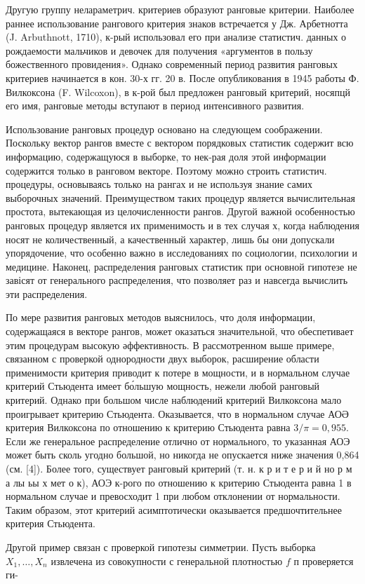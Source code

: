 \documentclass[10pt]{article}
\begin{document}
Другую группу нелараметрич. критериев образуют ранговые критерии. Наиболее раннее использование рангового критерия знаков встречается у Дж. Арбетнотта (J. Arbuthnott, 1710), к-рый использовал его при анализе статистич. данных о рождаемости мальчиков и девочек для получения «аргументов в пользу божественного провидения». Однако современный период развития ранговых критериев начинается в кон. 30-х гг. 20 в. После опубликования в 1945 работы Ф. Вилкоксона (F. Wilcoxon), в к-рой был предложен ранговый критерий, носяпцй его имя, ранговые методы вступают в период интенсивного развития.



Использование ранговых процедур основано на следующем соображении. Поскольку вектор рангов вместе с вектором порядковых статистик содержит всю информацию, содержащуюся в выборке, то нек-рая доля этой информации содержится только в ранговом векторе. Поэтому можно строить статистич. процедуры, основываясь только на рангах и не используя знание самих выборочных значений. Преимуществом таких процедур является вычислительная простота, вытекающая из целочисленности рангов. Другой важной особенностью ранговых процедур является их применимость и в тех случая х, когда наблюдения носят не количественный, а качественный характер, лишь бы они допускали упорядочение, что особенно важно в исследованиях по социологии, психологии и медицине. Наконец, распределения ранговых статистик при основной гипотезе не завісят от генерального распределения, что позволяет раз и навсегда вычислить эти распределения.



По мере развития ранговых методов выяснилось, что доля информации, содержащаяся в векторе рангов, может оказаться значительной, что обеспетивает этим процедурам высокую әффективность. В рассмотренном выше примере, связанном с проверкой однородности двух выборок, расширение области применимости критерия приводит к потере в мощности, и в нормальном случае критерий Стьюдента имеет бо́льшую мощность, нежели любой ранговый критерий. Однако при большом числе наблюдений критерий Вилкоксона мало проигрывает критерию Стьюдента. Оказывается, что в нормальном случае АОӘ критерия Вилкоксона по отношению к критерию Стьюдента равна $3 / \pi=0,955$. Если же генеральное распределение отлично от нормального, то указанная АОЭ может быть сколь угодно большой, но никогда не опускается ниже значения 0,864 (см. [4]). Более того, существует ранговый критерий (т. н. к р и т е р и й но р м а лы ьы х мет о к), АОЭ к-рого по отношению к критерию Стьюдента равна 1 в нормальном случае и превосходит 1 при любом отклонении от нормальности. Таким образом, этот критерий асимптотически оказывается предшочтительнее критерия Стьюдента.



Другой пример связан с проверкой гипотезы симметрии. Пусть выборка $X_{1}, \ldots, X_{n}$ извлечена из совокупности с генеральной плотностью $f$ п проверяется ги-
\end{document}

